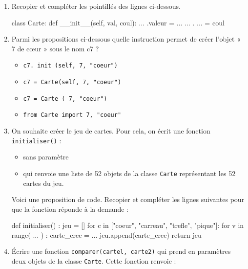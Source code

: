 \documentclass[
  letterpaper,
  DIV=11,
  numbers=noendperiod]{scrartcl}
\newenvironment{Shaded}{\begin{snugshade}}{\end{snugshade}}
\newcommand{\BuiltInTok}[1]{\textcolor[rgb]{0.00,0.23,0.31}{#1}}
\newcommand{\ControlFlowTok}[1]{\textcolor[rgb]{0.00,0.23,0.31}{#1}}
\newcommand{\FunctionTok}[1]{\textcolor[rgb]{0.28,0.35,0.67}{#1}}
\newcommand{\KeywordTok}[1]{\textcolor[rgb]{0.00,0.23,0.31}{#1}}
\newcommand{\NormalTok}[1]{\textcolor[rgb]{0.00,0.23,0.31}{#1}}
\newcommand{\OperatorTok}[1]{\textcolor[rgb]{0.37,0.37,0.37}{#1}}
\newcommand{\StringTok}[1]{\textcolor[rgb]{0.13,0.47,0.30}{#1}}
\newcommand{\VariableTok}[1]{\textcolor[rgb]{0.07,0.07,0.07}{#1}}
\providecommand{\tightlist}{%
  \setlength{\itemsep}{0pt}\setlength{\parskip}{0pt}}\usepackage{longtable,booktabs,array}
\begin{document}
\begin{enumerate}
\def\labelenumi{\arabic{enumi}.}
\item
  Recopier et compléter les pointillés des lignes ci-dessous.

\begin{Shaded}
\begin{Highlighting}[]
\KeywordTok{class}\NormalTok{ Carte:}
    \KeywordTok{def} \FunctionTok{\_\_init\_\_}\NormalTok{(}\VariableTok{self}\NormalTok{, val, coul):}
\NormalTok{        ... .valeur }\OperatorTok{=}\NormalTok{ ...}
\NormalTok{        ... . ... }\OperatorTok{=}\NormalTok{ coul}
\end{Highlighting}
\end{Shaded}
\item
  Parmi les propositions ci-dessous quelle instruction permet de créer
  l'objet « 7 de cœur » sous le nom c7 ?

  \begin{itemize}
  \tightlist
  \item
    \texttt{c7.\ init\ (self,\ 7,\ "coeur")}
  \item
    \texttt{c7\ =\ Carte(self,\ 7,\ "coeur")}
  \item
    \texttt{c7\ =\ Carte\ (\ 7,\ "coeur")}
  \item
    \texttt{from\ Carte\ import\ 7,\ "coeur"}
  \end{itemize}
\item
  On souhaite créer le jeu de cartes. Pour cela, on écrit une fonction
  \texttt{initialiser()} :

  \begin{itemize}
  \tightlist
  \item
    sans paramètre
  \item
    qui renvoie une liste de 52 objets de la classe \texttt{Carte}
    représentant les 52 cartes du jeu.
  \end{itemize}

  Voici une proposition de code. Recopier et compléter les lignes
  suivantes pour que la fonction réponde à la demande :

\begin{Shaded}
\begin{Highlighting}[]
\KeywordTok{def}\NormalTok{ initialiser() :}
\NormalTok{    jeu }\OperatorTok{=}\NormalTok{ [] }
    \ControlFlowTok{for}\NormalTok{ c }\KeywordTok{in}\NormalTok{ [}\StringTok{"coeur"}\NormalTok{, }\StringTok{"carreau"}\NormalTok{, }\StringTok{"trefle"}\NormalTok{, }\StringTok{"pique"}\NormalTok{]:}
        \ControlFlowTok{for}\NormalTok{ v }\KeywordTok{in} \BuiltInTok{range}\NormalTok{( ... ) :}
\NormalTok{            carte\_cree }\OperatorTok{=}\NormalTok{ ...}
\NormalTok{            jeu.append(carte\_cree)}
    \ControlFlowTok{return}\NormalTok{ jeu}
\end{Highlighting}
\end{Shaded}
\item
  Écrire une fonction \texttt{comparer(cartel,\ carte2)} qui prend en
  paramètres deux objets de la classe \texttt{Carte}. Cette fonction
  renvoie :


\end{enumerate}
\end{document}
